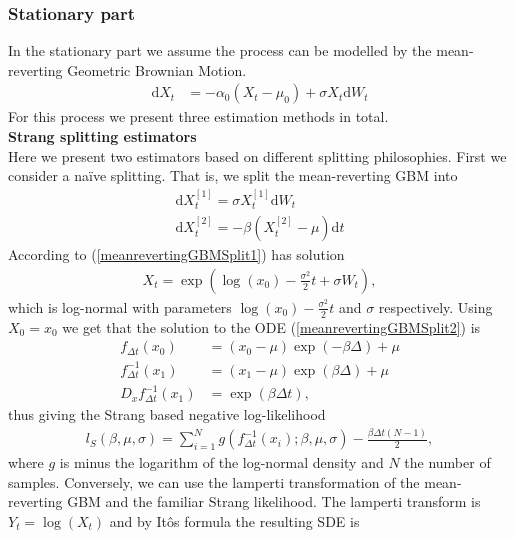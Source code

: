 \subsubsection{Stationary part}\label{subsubsec:meanrevertingGBMStationary}
In the stationary part we assume the process can be modelled by the mean-reverting Geometric Brownian Motion.
\begin{align}
    \mathrm{d}X_t &= -\alpha_0\left(X_t - \mu_0\right) + \sigma X_t \mathrm{d}W_t
\end{align}
For this process we present three estimation methods in total.\\
\noindent \textbf{Strang splitting estimators}\\
Here we present two estimators based on different splitting philosophies. First we consider a naïve splitting. That is, we split the mean-reverting GBM into
\begin{align}
    \mathrm{d}X_t^{[1]} = \sigma X_t^{[1]}\mathrm{d}W_t \label{meanrevertingGBMSplit1}\\
    \mathrm{d}X_t^{[2]} = -\beta\left(X_t^{[2]} - \mu\right)\mathrm{d}t \label{meanrevertingGBMSplit2}
\end{align}
According to \cite[example 4.7]{Srkk2019} (\ref{meanrevertingGBMSplit1}) has solution 
\begin{align}
    X_t = \exp\left(\log(x_0) -\frac{\sigma^2}{2}t + \sigma W_t\right),
\end{align}
which is log-normal with parameters $\log(x_0) -\frac{\sigma^2}{2}t$ and $\sigma$ respectively.
Using $X_0 = x_0$ we get that the solution to the ODE (\ref{meanrevertingGBMSplit2}) is
\begin{align}
    f_{\Delta t}(x_0) &= (x_0 - \mu)\exp(-\beta\Delta) + \mu\\
    f_{\Delta t}^{-1}(x_1) &=  (x_1 - \mu)\exp(\beta\Delta) + \mu\\
    D_x f_{\Delta t}^{-1}(x_1) &= \exp\left(\beta\Delta t\right),
\end{align}
thus giving the Strang based negative log-likelihood
\begin{align}
    l_S(\beta, \mu, \sigma) = \sum_{i = 1}^{N} g(f_{\Delta t}^{-1}(x_i); \beta,\mu, \sigma) - \frac{\beta\Delta t(N - 1)}{2},
\end{align}
where $g$ is minus the logarithm of the log-normal density and $N$ the number of samples.
Conversely, we can use the lamperti transformation of the mean-reverting GBM and the familiar Strang likelihood. The lamperti transform is $Y_t = \log(X_t)$ and by Itôs formula the resulting SDE is
